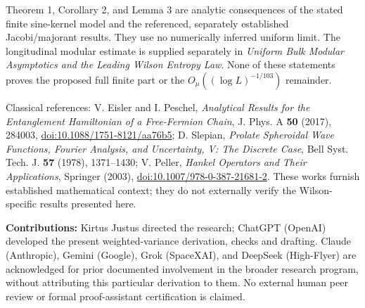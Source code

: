 \documentclass[
  10pt,
  a4paper,
]{article}
\begin{document}
Theorem 1, Corollary 2, and Lemma 3 are analytic consequences of the stated finite sine-kernel model and the referenced, separately established Jacobi/majorant results. They use no numerically inferred uniform limit. The longitudinal modular estimate is supplied separately in \emph{Uniform Bulk Modular Asymptotics and the Leading Wilson Entropy Law}. None of these statements proves the proposed full finite part or the \(O_\mu((\log L)^{-1/103})\) remainder.

Classical references: V. Eisler and I. Peschel, \emph{Analytical Results for the Entanglement Hamiltonian of a Free-Fermion Chain}, J. Phys. A \textbf{50} (2017), 284003, \url{doi:10.1088/1751-8121/aa76b5}; D. Slepian, \emph{Prolate Spheroidal Wave Functions, Fourier Analysis, and Uncertainty, V: The Discrete Case}, Bell Syst. Tech. J. \textbf{57} (1978), 1371--1430; V. Peller, \emph{Hankel Operators and Their Applications}, Springer (2003), \url{doi:10.1007/978-0-387-21681-2}. These works furnish established mathematical context; they do not externally verify the Wilson-specific results presented here.

\textbf{Contributions:} Kirtus Justus directed the research; ChatGPT (OpenAI) developed the present weighted-variance derivation, checks and drafting. Claude (Anthropic), Gemini (Google), Grok (SpaceXAI), and DeepSeek (High-Flyer) are acknowledged for prior documented involvement in the broader research program, without attributing this particular derivation to them. No external human peer review or formal proof-assistant certification is claimed.
\end{document}
